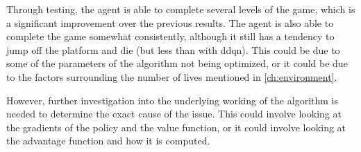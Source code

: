 Through testing, the agent is able to complete several levels of the game,
which is a significant improvement over the previous results. The agent is
also able to complete the game somewhat consistently, although it still has
a tendency to jump off the platform and die (but less than with \gls{ddqn}).
This could be due to some of the parameters of the algorithm not being
optimized, or it could be due to the factors surrounding the number of lives
mentioned in \cref{ch:environment}.

However, further investigation into the underlying working of the algorithm
is needed to determine the exact cause of the issue. This could involve
looking at the gradients of the policy and the value function, or it could
involve looking at the advantage function and how it is computed.